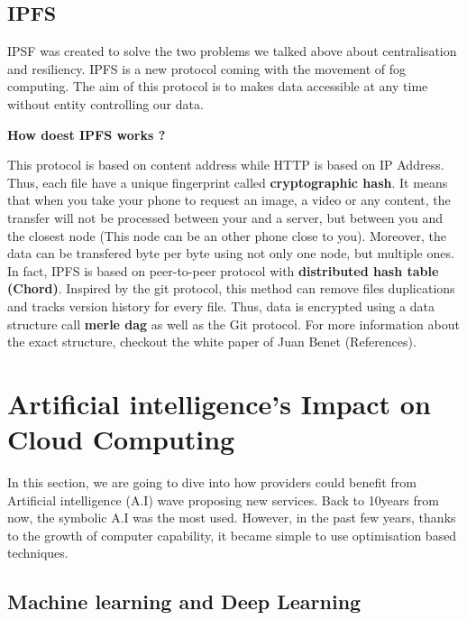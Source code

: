 \subsection{IPFS}

IPSF was created to solve the two problems we talked above about centralisation and resiliency. IPFS is a new protocol coming with the movement of fog computing. The aim of this protocol is to makes data accessible at any time without entity controlling our data.

\textbf{How doest IPFS works ?}

This protocol is based on content address while HTTP is based on IP Address. Thus, each file have a unique fingerprint called \textbf{cryptographic hash}. It means that when you take your phone to request an image, a video or any content, the transfer will not be processed between your and a server, but between you and the closest node (This node can be an other phone close to you). Moreover, the data can be transfered byte per byte using not only one node, but multiple ones. In fact, IPFS is based on peer-to-peer protocol with \textbf{distributed hash table (Chord)}. Inspired by the git protocol, this method can remove files duplications and tracks version history for every file. Thus, data is encrypted using a data structure call \textbf{merle dag} as well as the Git protocol. For more information about the exact structure, checkout the white paper of Juan Benet (References).

\section{Artificial intelligence’s Impact on Cloud Computing}

In this section, we are going to dive into how providers could benefit from Artificial intelligence (A.I) wave proposing new services. Back to 10years from now, the symbolic A.I was the most used. However, in the past few years, thanks to the growth of computer capability, it became simple to use optimisation based techniques.

\subsection{Machine learning and Deep Learning}

